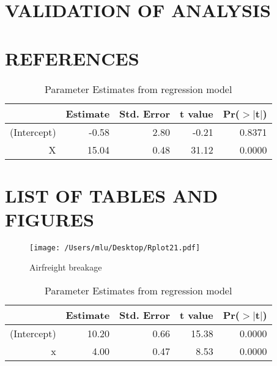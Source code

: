 \documentclass{article}
\begin{document}
\section{VALIDATION OF ANALYSIS}
\label{sec:Validation of Analysis}  
      
        
\section{REFERENCES}
\label{sec:References}

     
           
      




\begin{table}[ht]
\centering
\begin{tabular}{rrrrr}
  \hline
 & Estimate & Std. Error & t value & Pr($>$$|$t$|$) \\ 
  \hline
(Intercept) & -0.58 & 2.80 & -0.21 & 0.8371 \\ 
  X & 15.04 & 0.48 & 31.12 & 0.0000 \\ 
   \hline
\end{tabular}
\caption{Parameter Estimates from regression model} 
\label{reg1}
\end{table} 

\section{LIST OF TABLES AND FIGURES}
\label{sec:List of Table and Figures}

     
     
     \begin{figure}[htb]
     \begin{center}
     \texttt{[image: /Users/mlu/Desktop/Rplot21.pdf]}
     \caption{Airfreight breakage }
     \end{center}
     \end{figure}


       
      

\begin{table}[ht]
\centering
\begin{tabular}{rrrrr}
  \hline
 & Estimate & Std. Error & t value & Pr($>$$|$t$|$) \\ 
  \hline
(Intercept) & 10.20 & 0.66 & 15.38 & 0.0000 \\ 
  x & 4.00 & 0.47 & 8.53 & 0.0000 \\ 
   \hline
\end{tabular}
\caption{Parameter Estimates from regression model} 
\label{reg21}
\end{table}
         
\end{document}
